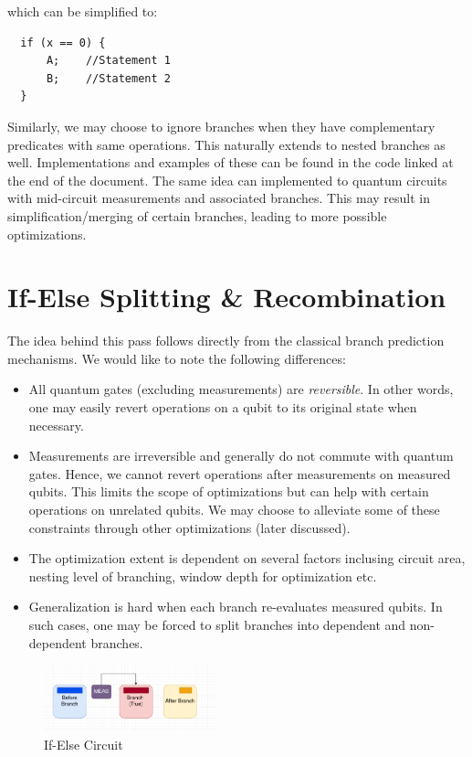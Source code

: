\documentclass[10pt]{article}
\begin{document}
which can be simplified to:

\begin{center}
\begin{BVerbatim}
  if (x == 0) {
      A;    //Statement 1
      B;    //Statement 2
  }
\end{BVerbatim}
\end{center}

Similarly, we may choose to ignore branches when they have complementary predicates with same operations. This naturally extends to nested branches as well. Implementations and examples of these can be found in the code linked at the end of the document. The same idea can implemented to quantum circuits with mid-circuit measurements and associated branches. This may result in simplification/merging of certain branches, leading to more possible optimizations.


\section{If-Else Splitting \& Recombination}
The idea behind this pass follows directly from the classical branch prediction mechanisms. We would like to note the following differences:
\begin{itemize}
  \item All quantum gates (excluding measurements) are \emph{reversible}. In other words, one may easily revert operations on a qubit to its original state when necessary.
  \item Measurements are irreversible and generally do not commute with quantum gates. Hence, we cannot revert operations after measurements on measured qubits. This limits the scope of optimizations but can help with certain operations on unrelated qubits. We may choose to alleviate some of these constraints through other optimizations (later discussed).
  \item The optimization extent is dependent on several factors inclusing circuit area, nesting level of branching, window depth for optimization etc.
  \item Generalization is hard when each branch re-evaluates measured qubits. In such cases, one may be forced to split branches into dependent and non-dependent branches.
\end{itemize}

\begin{figure}[h]
\centering
  \includegraphics[width=0.45\textwidth]{Images/start.png}
  \caption{If-Else Circuit}
  \label{fig:ifelse}
\end{figure}
\end{document}
